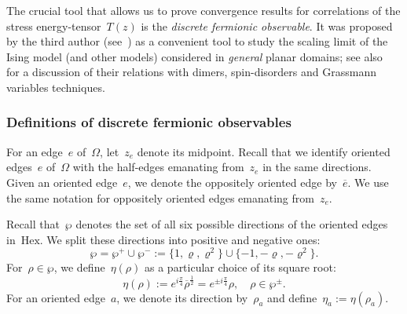 \documentclass[reqno,11pt,a4paper]{amsart}
\theoremstyle{remark}
\newcommand{\Hex}{\mathrm{Hex}}
\begin{document}
The crucial tool that allows us to prove convergence results for correlations of the stress energy-tensor~$T(z)$ is the \emph{discrete fermionic observable}. 
It was proposed by the third author (see~\cite[Section~4]{Smi10a}) as a convenient tool to study the scaling limit of the Ising model (and other models) considered in \emph{general} planar domains; see also~\cite[Section~3]{CheCimKas15} for a discussion of their relations with dimers, spin-disorders and Grassmann variables techniques.

\subsubsection{Definitions of discrete fermionic observables}

For an edge~$e$ of~$\Omega$, let~$z_e$ denote its midpoint. Recall that we identify oriented edges~$e$ of~$\Omega$ with the half-edges emanating from~$z_e$ in the same directions.
Given an oriented edge~$e$, we denote the oppositely oriented edge by~$\overline{e}$.
We use the same notation for oppositely oriented edges emanating from~$z_e$.

Recall that~$\wp$ denotes the set of all six possible directions of the oriented edges in~$\Hex$.
We split these directions into positive and negative ones: 
\[
	\wp=\wp^+\cup\wp^-:=\{1,\varrho,\varrho^2\}\cup \{-1,-\varrho,-\varrho^2\}.
\]
For~$\rho\in \wp$, we define~$\eta(\rho)$ as a particular choice of its square root: 
\begin{equation}
	\label{eq:eta=rho}
	\eta(\rho):=e^{i\frac{\pi}{4}}\overline{\rho}^{\frac{1}{2}}=e^{\pm i\frac{\pi}{4}}\rho,\quad \rho\in\wp^\pm.
\end{equation}
For an oriented edge~$a$, we denote its direction by~$\rho_a$ and define~$\eta_a:=\eta(\rho_a)$.
\end{document}
